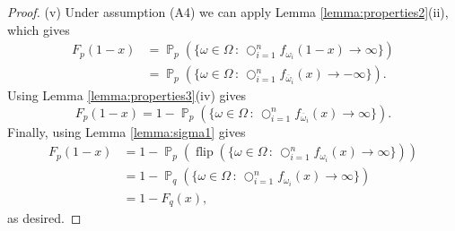 \documentclass[10pt,a4paper]{amsart}
\DeclareMathOperator{\bigcomp}{\bigcirc}
\DeclareMathOperator{\prob}{\mathbb{P}}
\DeclareMathOperator{\rec}{flip}
\begin{document}
\begin{proof}
(v) Under assumption (A4) we can apply Lemma \ref{lemma:properties2}(ii), which gives
\[
\begin{split}
F_{p}(1-x)
	& = \prob_p(\{ \omega \in \Omega \,:\, \bigcomp_{i=1}^n f_{\omega_i}(1-x) \to \infty \}) \\
	& = \prob_p(\{ \omega \in \Omega \,:\, \bigcomp_{i=1}^n f_{\overline{\omega}_i}(x) \to -\infty \}).
\end{split}
\]
Using Lemma \ref{lemma:properties3}(iv) gives
\[
F_{p}(1-x)
	= 1-\prob_p(\{ \omega \in \Omega \,:\, \bigcomp_{i=1}^n f_{\overline{\omega}_i}(x) \to \infty \}).
\]
Finally, using Lemma \ref{lemma:sigma1} gives
\[
\begin{split}
F_{p}(1-x)
	& = 1-\prob_p(\rec(\{ \omega \in \Omega \,:\, \bigcomp_{i=1}^n f_{\omega_i}(x) \to \infty \})) \\
	& = 1-\prob_q(\{ \omega \in \Omega \,:\, \bigcomp_{i=1}^n f_{\omega_i}(x) \to \infty \}) \\
	& = 1-F_{q}(x),
\end{split}
\]
as desired.
\end{proof}
\end{document}
